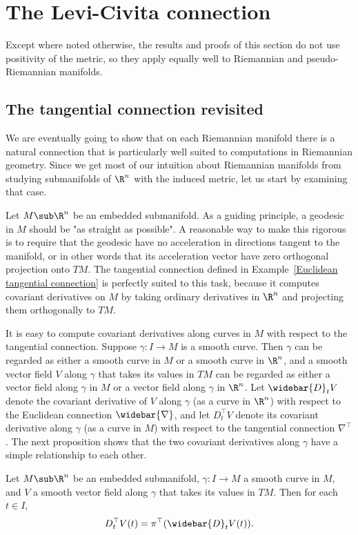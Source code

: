 \section{The Levi-Civita connection}
Except where noted otherwise, the results and proofs of this section do not use positivity of the metric, so they apply equally well to Riemannian and pseudo-Riemannian manifolds.
\subsection{The tangential connection revisited}
We are eventually going to show that on each Riemannian manifold there is a natural connection that is particularly well suited to computations in Riemannian geometry. 
Since we get most of our intuition about Riemannian manifolds from studying submanifolds of $\R^n$ with the induced metric, let us start by examining that case.\par
Let $M\sub\R^n$ be an embedded submanifold. As a guiding principle, a geodesic in $M$ should be "as straight as possible". A reasonable way to make this rigorous is to 
require that the geodesic have no acceleration in directions tangent to the manifold, or in other words that its acceleration vector have zero orthogonal projection 
onto $TM$. The tangential connection defined in Example~\ref{Euclidean tangential connection} is perfectly suited to this task, because it computes covariant 
derivatives on $M$ by taking ordinary derivatives in $\R^n$ and projecting them orthogonally to $TM$.\par
It is easy to compute covariant derivatives along curves in $M$ with respect to the tangential connection. Suppose $\gamma:I\to M$ is a smooth curve. Then $\gamma$ can 
be regarded as either a smooth curve in $M$ or a smooth curve in $\R^n$, and a smooth vector field $V$ along $\gamma$ that takes its values in $TM$ can be regarded as 
either a vector field along $\gamma$ in $M$ or a vector field along $\gamma$ in $\R^n$. Let $\widebar{D}_tV$ denote the covariant derivative of $V$ along $\gamma$ 
(as a curve in $\R^n$) with respect to the Euclidean connection $\widebar{\nabla}$, and let $D_t^{\top}V$ denote its covariant derivative along $\gamma$ (as a curve in $M$) 
with respect to the tangential connection $\nabla^{\top}$. The next proposition shows that the two covariant derivatives along $\gamma$ have a simple relationship to 
each other.
\begin{proposition}\label{Euclidean derivative curve}
Let $M\sub\R^n$ be an embedded submanifold, $\gamma:I\to M$ a smooth curve in $M$, and $V$ a smooth vector field along $\gamma$ that takes its values in $TM$. Then for 
each $t\in I$,
\[D^{\top}_tV(t)=\pi^{\top}(\widebar{D}_tV(t)).\]
\end{proposition}
